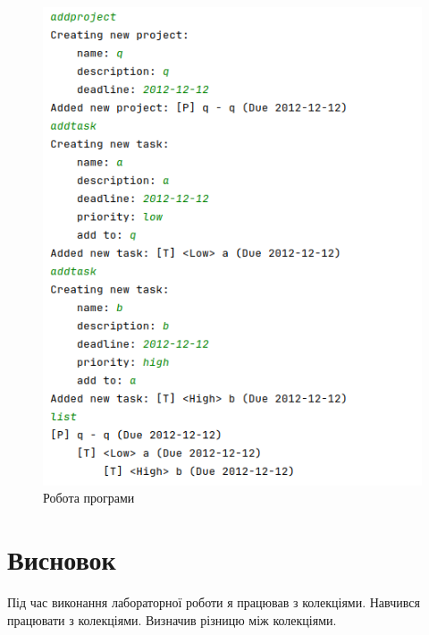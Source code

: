\documentclass[14pt]{extreport}
\begin{document}
\begin{normalsize}
	\begin{figure}[H]
		\centering
		\includegraphics[scale=0.55]{1}
		\caption{Робота програми}
	\end{figure}

	\section*{Висновок}
	Під час виконання лабораторної роботи я працював з колекціями. Навчився працювати з колекціями. Визначив різницю між колекціями.
	 
\end{normalsize}
\end{document}
